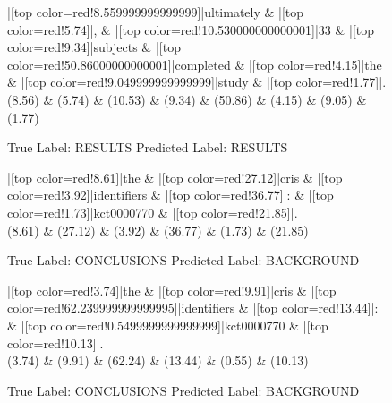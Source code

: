 \documentclass[a4paper, landscape]{article}
\begin{document}
\begin{figure}
\begin{center}
\begin{dependency}
\begin{deptext}
|[top color=red!8.559999999999999]|ultimately \& |[top color=red!5.74]|, \& |[top color=red!10.530000000000001]|33 \& |[top color=red!9.34]|subjects \& |[top color=red!50.86000000000001]|completed \& |[top color=red!4.15]|the \& |[top color=red!9.049999999999999]|study \& |[top color=red!1.77]|.\\
(8.56) \& (5.74) \& (10.53) \& (9.34) \& (50.86) \& (4.15) \& (9.05) \& (1.77)\\
\end{deptext}
\end{dependency}
\end{center}
\caption{True Label: RESULTS Predicted Label: RESULTS}
\end{figure}
\clearpage
\begin{figure}
\begin{center}
\begin{dependency}
\begin{deptext}
|[top color=red!8.61]|the \& |[top color=red!27.12]|cris \& |[top color=red!3.92]|identifiers \& |[top color=red!36.77]|: \& |[top color=red!1.73]|kct0000770 \& |[top color=red!21.85]|.\\
(8.61) \& (27.12) \& (3.92) \& (36.77) \& (1.73) \& (21.85)\\
\end{deptext}
\end{dependency}
\end{center}
\caption{True Label: CONCLUSIONS Predicted Label: BACKGROUND}
\end{figure}
\clearpage
\begin{figure}
\begin{center}
\begin{dependency}
\begin{deptext}
|[top color=red!3.74]|the \& |[top color=red!9.91]|cris \& |[top color=red!62.239999999999995]|identifiers \& |[top color=red!13.44]|: \& |[top color=red!0.5499999999999999]|kct0000770 \& |[top color=red!10.13]|.\\
(3.74) \& (9.91) \& (62.24) \& (13.44) \& (0.55) \& (10.13)\\
\end{deptext}
\end{dependency}
\end{center}
\caption{True Label: CONCLUSIONS Predicted Label: BACKGROUND}
\end{figure}
\end{document}
